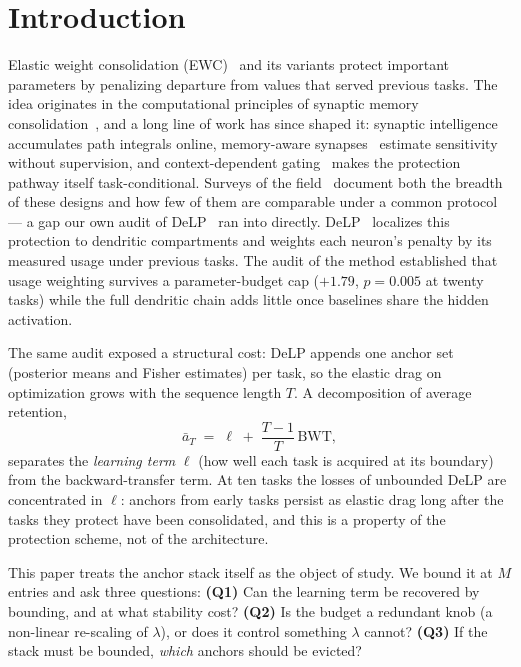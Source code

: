 \documentclass[review,12pt,number]{elsarticle}
\newcommand{\delp}{DeLP}
\begin{document}
\section{Introduction}
\label{sec:intro}

Elastic weight consolidation (EWC)~\cite{kirkpatrick2017} and its
variants protect important parameters by penalizing departure from
values that served previous tasks. The idea originates in the
computational principles of synaptic memory consolidation~\cite{benna2016},
and a long line of work has since shaped it: synaptic
intelligence~\cite{zenke2017} accumulates path integrals online,
memory-aware synapses~\cite{aljundi2018} estimate sensitivity without
supervision, and context-dependent gating~\cite{masse2018} makes the
protection pathway itself task-conditional. Surveys
of the field~\cite{parisi2019,delange2022} document both the breadth of
these designs and how few of them are comparable under a common
protocol --- a gap our own audit of \delp{}~\cite{zhou2026delp} ran into
directly.
\delp{}~\cite{zhou2026delp} localizes this protection to dendritic
compartments and weights each neuron's penalty by its measured usage
under previous tasks. The audit of the method
established that usage weighting survives a parameter-budget cap
($+1.79$, $p{=}0.005$ at twenty tasks) while the full dendritic chain
adds little once baselines share the hidden activation.

The same audit exposed a structural cost: \delp{} appends one anchor
set (posterior means and Fisher estimates) per task, so the elastic
drag on optimization grows with the sequence length $T$.
A decomposition of average retention,
%
\begin{equation}
\label{eq:decomp}
\bar a_T \;=\; \ell \;+\; \frac{T-1}{T}\,\mathrm{BWT},
\end{equation}
%
separates the \emph{learning term} $\ell$ (how well each task is
acquired at its boundary) from the backward-transfer term.
At ten tasks the losses of unbounded \delp{} are concentrated in $\ell$:
anchors from early tasks persist as elastic drag long after the tasks
they protect have been consolidated, and this is a property of the
protection scheme, not of the architecture.


This paper treats the anchor stack itself as the object of study.
We bound it at $M$ entries and ask three questions:
\textbf{(Q1)} Can the learning term be recovered by bounding, and at
what stability cost?
\textbf{(Q2)} Is the budget a redundant knob (a non-linear re-scaling
of $\lambda$), or does it control something $\lambda$ cannot?
\textbf{(Q3)} If the stack must be bounded, \emph{which} anchors should
be evicted?
\end{document}
